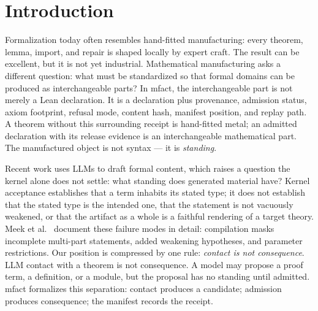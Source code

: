 \documentclass[11pt]{article}
\begin{document}
\begin{abstract}
The result is not a claim that arbitrary generated mathematics is
automatically correct. Rice-style undecidability is respected rather than
ignored: MathProofOps replaces the impossible question ``is this arbitrary
generated artifact semantically correct?'' with the bounded, replayable
question ``did this candidate pass the declared admission gate inside
boundary \(B\)?'' More generally, public ontologies supply a domain's
nouns; MathProofOps supplies standing. The method generalizes from process
intelligence to any ontology-bearing field whose artifacts can be
projected, admitted, receipted, and replayed. The evaluation section of
this paper is generated from the release manifest rather than written by
hand, and a kernel-checked \emph{Standing Quadrature} witness closes the
cross-product between the declaration catalog, the admitted corpus, the
release manifest, the process evidence, and this paper's claims. We report
exactly what was proven, what remains stated, what was refused, and what
the release boundary excludes.
\end{abstract}

\section{Introduction}

Formalization today often resembles hand-fitted manufacturing: every
theorem, lemma, import, and repair is shaped locally by expert craft. The
result can be excellent, but it is not yet industrial. Mathematical
manufacturing asks a different question: what must be standardized so that
formal domains can be produced as interchangeable parts? In
\textsf{mfact}, the interchangeable part is not merely a Lean declaration.
It is a declaration plus provenance, admission status, axiom footprint,
refusal mode, content hash, manifest position, and replay path. A theorem without
this surrounding receipt is hand-fitted metal; an admitted declaration
with its release evidence is an interchangeable mathematical part. The
manufactured object is not syntax --- it is \emph{standing}.

Recent work uses LLMs to draft formal content, which raises a question
the kernel alone does not settle: what standing does generated material
have? Kernel acceptance establishes that a term inhabits its stated type;
it does not establish that the stated type is the intended one, that the
statement is not vacuously weakened, or that the artifact as a whole is a
faithful rendering of a target theory. Meek et
al.~\cite{meek2026formalizing} document these failure modes in detail:
compilation masks incomplete multi-part statements, added weakening
hypotheses, and parameter restrictions. Our position is compressed by one
rule: \emph{contact is not consequence}. LLM contact with a theorem is
not consequence. A model may propose a proof term, a definition, or a
module, but the proposal has no standing until admitted. \textsf{mfact}
formalizes this separation: contact produces a candidate; admission
produces consequence; the manifest records the receipt.
\end{document}
